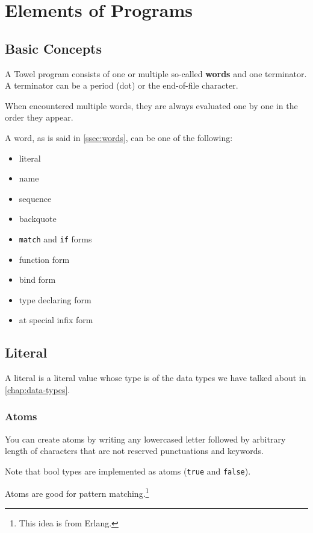 \documentclass{book}
\begin{document}
\chapter{Elements of Programs}
\label{chap:forms}

\section{Basic Concepts}

A Towel program consists of one or multiple so-called \textbf{words} and one terminator. A terminator can be a period (dot) or the end-of-file character.

When encountered multiple words, they are always evaluated one by one in the order they appear.

A word, as is said in \autoref{ssec:words}, can be one of the following:
\begin{itemize}
\item literal
\item name
\item sequence
\item backquote
\item \texttt{match} and \texttt{if} forms
\item function form
\item bind form
\item type declaring form
\item at special infix form
\end{itemize}

\section{Literal}

A literal is a literal value whose type is of the data types we have talked about in \autoref{chap:data-types}.

\subsection{Atoms}

You can create atoms by writing any lowercased letter followed by arbitrary length of characters that are not reserved punctuations and keywords.

Note that bool types are implemented as atoms (\texttt{true\Bool} and \texttt{false\Bool}).

Atoms are good for pattern matching.\footnote{This idea is from Erlang.}
\end{document}
